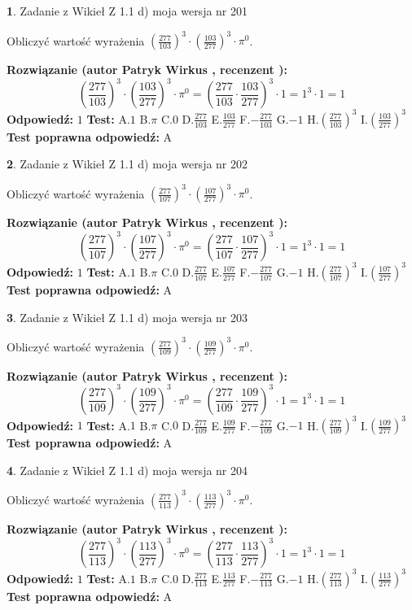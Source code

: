 \documentclass[12pt, a4paper]{article}
\theoremstyle{definition} %
\newtheorem{zad}{}
\newcommand{\zadStart}[1]{\begin{zad}#1\newline}
\newcommand{\zadStop}{\end{zad}}
\newcommand{\rozwStart}[2]{\noindent \textbf{Rozwiązanie (autor #1 , recenzent #2): }\newline}
\newcommand{\rozwStop}{\newline}
\newcommand{\odpStart}{\noindent \textbf{Odpowiedź:}\newline}
\newcommand{\odpStop}{\newline}
\newcommand{\testStart}{\noindent \textbf{Test:}\newline}
\newcommand{\testStop}{\newline}
\newcommand{\kluczStart}{\noindent \textbf{Test poprawna odpowiedź:}\newline}
\newcommand{\kluczStop}{\newline}
\begin{document}
\zadStart{Zadanie z Wikieł Z 1.1 d) moja wersja nr 201}

Obliczyć wartość wyrażenia $(\frac{277}{103})^{3} \cdot (\frac{103}{277})^{3} \cdot \pi^{0}$.
\zadStop
\rozwStart{Patryk Wirkus}{}
$$(\frac{277}{103})^{3} \cdot (\frac{103}{277})^{3} \cdot \pi^{0} = (\frac{277}{103} \cdot \frac{103}{277})^{3} \cdot 1 = 1^{3} \cdot 1 = 1$$
\rozwStop
\odpStart
$1$
\odpStop
\testStart
A.$1$ B.$\pi$ C.$0$ D.$\frac{277}{103}$ E.$\frac{103}{277}$
F.$-\frac{277}{103}$ G.$-1$
H.$(\frac{277}{103})^{3}$
I.$(\frac{103}{277})^{3}$
\testStop
\kluczStart
A
\kluczStop



\zadStart{Zadanie z Wikieł Z 1.1 d) moja wersja nr 202}

Obliczyć wartość wyrażenia $(\frac{277}{107})^{3} \cdot (\frac{107}{277})^{3} \cdot \pi^{0}$.
\zadStop
\rozwStart{Patryk Wirkus}{}
$$(\frac{277}{107})^{3} \cdot (\frac{107}{277})^{3} \cdot \pi^{0} = (\frac{277}{107} \cdot \frac{107}{277})^{3} \cdot 1 = 1^{3} \cdot 1 = 1$$
\rozwStop
\odpStart
$1$
\odpStop
\testStart
A.$1$ B.$\pi$ C.$0$ D.$\frac{277}{107}$ E.$\frac{107}{277}$
F.$-\frac{277}{107}$ G.$-1$
H.$(\frac{277}{107})^{3}$
I.$(\frac{107}{277})^{3}$
\testStop
\kluczStart
A
\kluczStop



\zadStart{Zadanie z Wikieł Z 1.1 d) moja wersja nr 203}

Obliczyć wartość wyrażenia $(\frac{277}{109})^{3} \cdot (\frac{109}{277})^{3} \cdot \pi^{0}$.
\zadStop
\rozwStart{Patryk Wirkus}{}
$$(\frac{277}{109})^{3} \cdot (\frac{109}{277})^{3} \cdot \pi^{0} = (\frac{277}{109} \cdot \frac{109}{277})^{3} \cdot 1 = 1^{3} \cdot 1 = 1$$
\rozwStop
\odpStart
$1$
\odpStop
\testStart
A.$1$ B.$\pi$ C.$0$ D.$\frac{277}{109}$ E.$\frac{109}{277}$
F.$-\frac{277}{109}$ G.$-1$
H.$(\frac{277}{109})^{3}$
I.$(\frac{109}{277})^{3}$
\testStop
\kluczStart
A
\kluczStop



\zadStart{Zadanie z Wikieł Z 1.1 d) moja wersja nr 204}

Obliczyć wartość wyrażenia $(\frac{277}{113})^{3} \cdot (\frac{113}{277})^{3} \cdot \pi^{0}$.
\zadStop
\rozwStart{Patryk Wirkus}{}
$$(\frac{277}{113})^{3} \cdot (\frac{113}{277})^{3} \cdot \pi^{0} = (\frac{277}{113} \cdot \frac{113}{277})^{3} \cdot 1 = 1^{3} \cdot 1 = 1$$
\rozwStop
\odpStart
$1$
\odpStop
\testStart
A.$1$ B.$\pi$ C.$0$ D.$\frac{277}{113}$ E.$\frac{113}{277}$
F.$-\frac{277}{113}$ G.$-1$
H.$(\frac{277}{113})^{3}$
I.$(\frac{113}{277})^{3}$
\testStop
\kluczStart
A
\kluczStop
\end{document}
